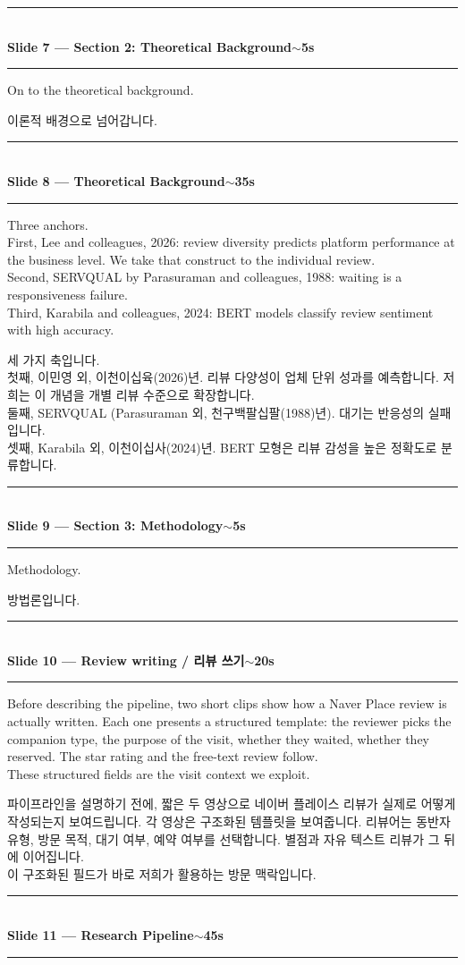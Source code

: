 \documentclass[10pt,a4paper]{article}
\newcommand{\sechead}[2]{%
  \vspace{6pt}%
  \noindent\rule{\linewidth}{0.6pt}\\[1pt]
  {\small\bfseries #1\hfill #2}\\[-3pt]
  \rule{\linewidth}{0.4pt}\par\vspace{2pt}%
}
\newcommand{\sent}[1]{#1\\[4pt]}
\newcommand{\bilingual}[2]{%
  \noindent%
  \begin{minipage}[t]{0.485\linewidth}
    \small #1
  \end{minipage}\hfill\vrule\hfill%
  \begin{minipage}[t]{0.483\linewidth}
    \small #2
  \end{minipage}\par\vspace{3pt}%
}
\begin{document}
\sechead{Slide 7 --- Section 2: Theoretical Background}{$\sim$5s}

\bilingual{%
\sent{On to the theoretical background.}
}{%
\sent{이론적 배경으로 넘어갑니다.}
}

\sechead{Slide 8 --- Theoretical Background}{$\sim$35s}

\bilingual{%
\sent{Three anchors.}
\sent{First, Lee and colleagues, 2026: review diversity predicts
platform performance at the business level. We take that construct to the
individual review.}
\sent{Second, SERVQUAL by Parasuraman and colleagues, 1988: waiting is a
responsiveness failure.}
\sent{Third, Karabila and colleagues, 2024: BERT models classify review
sentiment with high accuracy.}
}{%
\sent{세 가지 축입니다.}
\sent{첫째, 이민영 외, 이천이십육(2026)년. 리뷰 다양성이 업체 단위
성과를 예측합니다. 저희는 이 개념을 개별 리뷰 수준으로 확장합니다.}
\sent{둘째, SERVQUAL (Parasuraman 외, 천구백팔십팔(1988)년). 대기는 반응성의
실패입니다.}
\sent{셋째, Karabila 외, 이천이십사(2024)년. BERT 모형은 리뷰 감성을 높은
정확도로 분류합니다.}
}

\sechead{Slide 9 --- Section 3: Methodology}{$\sim$5s}

\bilingual{%
\sent{Methodology.}
}{%
\sent{방법론입니다.}
}

\sechead{Slide 10 --- Review writing / 리뷰 쓰기}{$\sim$20s}

\bilingual{%
\sent{Before describing the pipeline, two short clips show how a Naver
Place review is actually written. Each one presents a structured
template: the reviewer picks the companion type, the purpose of the
visit, whether they waited, whether they reserved. The star rating and
the free-text review follow.}
\sent{These structured fields are the visit context we exploit.}
}{%
\sent{파이프라인을 설명하기 전에, 짧은 두 영상으로 네이버 플레이스
리뷰가 실제로 어떻게 작성되는지 보여드립니다. 각 영상은 구조화된
템플릿을 보여줍니다. 리뷰어는 동반자 유형, 방문 목적, 대기 여부, 예약
여부를 선택합니다. 별점과 자유 텍스트 리뷰가 그 뒤에 이어집니다.}
\sent{이 구조화된 필드가 바로 저희가 활용하는 방문 맥락입니다.}
}

\sechead{Slide 11 --- Research Pipeline}{$\sim$45s}
\end{document}
